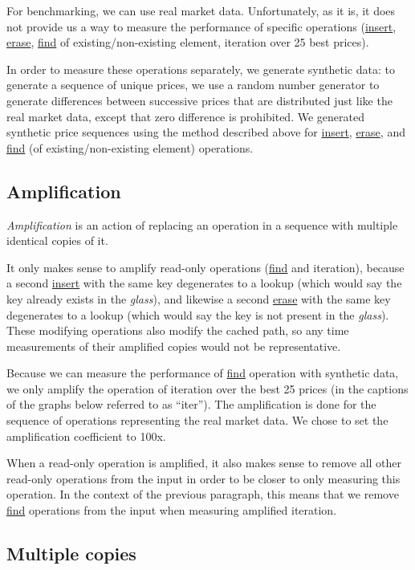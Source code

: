 \documentclass[a4paper,12pt]{article}
\begin{document}
For benchmarking, we can use real market data.
Unfortunately, as it is, it does not provide us a way to measure the performance of specific operations
(\underline{insert}, \underline{erase}, \underline{find} of existing/non-existing element, iteration over 25 best prices).

In order to measure these operations separately, we generate synthetic data: to generate a sequence of unique prices,
we use a random number generator to generate differences between successive prices that are distributed just like
the real market data, except that zero difference is prohibited.
We generated synthetic price sequences using the method described above for
\underline{insert}, \underline{erase}, and \underline{find} (of existing/non-existing element)
operations.

\subsection{Amplification}

\textit{Amplification} is an action of replacing an operation in a sequence with multiple identical copies of it.

It only makes sense to amplify read-only operations (\underline{find} and iteration), because
a second \underline{insert} with the same key degenerates to a lookup (which would say the key already exists in the \textit{glass}),
and likewise a second \underline{erase} with the same key degenerates to a lookup (which would say the key is not present in the \textit{glass}).
These modifying operations also modify the cached path, so any time measurements of their amplified copies would not be representative.

Because we can measure the performance of \underline{find} operation with synthetic data,
we only amplify the operation of iteration over the best 25 prices (in the captions of the graphs below referred to as ``iter'').
The amplification is done for the sequence of operations representing the real market data.
We chose to set the amplification coefficient to 100x.

When a read-only operation is amplified, it also makes sense to remove all other read-only operations from the input
in order to be closer to only measuring this operation.
In the context of the previous paragraph, this means that we remove \underline{find} operations from the input
when measuring amplified iteration.

\subsection{Multiple copies}
\end{document}
